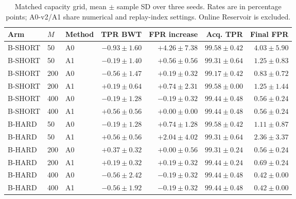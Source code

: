 \begin{table}[t]
\caption{Matched capacity grid, mean $\pm$ sample SD over three seeds. Rates are in percentage points; A0-v2/A1 share numerical and replay-index settings. Online Reservoir is excluded.}
\label{tab:r3-capacity}

\centering
\small
\setlength{\tabcolsep}{3pt}
\begin{tabular*}{\textwidth}{@{\extracolsep{\fill}}lllr rrr@{}}
\toprule
Arm & $M$ & Method & TPR BWT & FPR increase & Acq. TPR & Final FPR \\
\midrule
B-SHORT & 50 & A0 & $-0.93\pm1.60$ & $+4.26\pm7.38$ & $99.58\pm0.42$ & $4.03\pm5.90$ \\
B-SHORT & 50 & A1 & $-0.19\pm1.40$ & $+0.56\pm0.56$ & $99.31\pm0.64$ & $1.25\pm0.83$ \\
B-SHORT & 200 & A0 & $-0.56\pm1.47$ & $+0.19\pm0.32$ & $99.17\pm0.42$ & $0.83\pm0.72$ \\
B-SHORT & 200 & A1 & $+0.19\pm0.64$ & $+0.74\pm2.31$ & $99.58\pm0.00$ & $1.25\pm1.44$ \\
B-SHORT & 400 & A0 & $-0.19\pm1.28$ & $-0.19\pm0.32$ & $99.44\pm0.48$ & $0.56\pm0.24$ \\
B-SHORT & 400 & A1 & $+0.56\pm0.56$ & $+0.00\pm0.00$ & $99.44\pm0.48$ & $0.56\pm0.24$ \\
B-HARD & 50 & A0 & $-0.19\pm1.28$ & $+0.74\pm1.28$ & $99.58\pm0.42$ & $1.11\pm0.87$ \\
B-HARD & 50 & A1 & $+0.56\pm0.56$ & $+2.04\pm4.02$ & $99.31\pm0.64$ & $2.36\pm3.37$ \\
B-HARD & 200 & A0 & $+0.37\pm0.32$ & $+0.00\pm0.56$ & $99.31\pm0.24$ & $0.56\pm0.24$ \\
B-HARD & 200 & A1 & $+0.19\pm0.32$ & $+0.19\pm0.32$ & $99.44\pm0.24$ & $0.69\pm0.24$ \\
B-HARD & 400 & A0 & $-0.56\pm2.42$ & $-0.19\pm0.32$ & $99.44\pm0.48$ & $0.42\pm0.00$ \\
B-HARD & 400 & A1 & $-0.56\pm1.92$ & $-0.19\pm0.32$ & $99.44\pm0.48$ & $0.42\pm0.00$ \\
\bottomrule
\end{tabular*}


\end{table}
